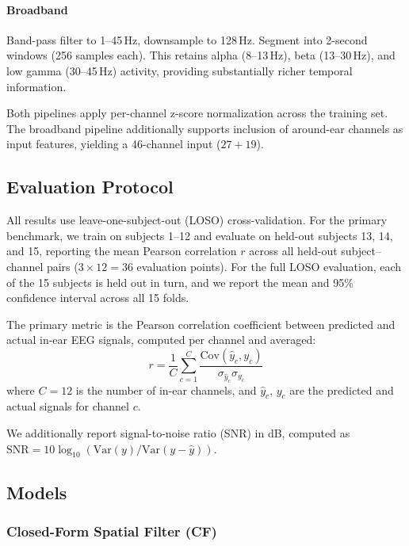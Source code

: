 \documentclass[conference]{IEEEtran}
\begin{document}
\paragraph{Broadband} Band-pass filter to 1--45\,Hz, downsample to 128\,Hz. Segment into 2-second windows (256 samples each). This retains alpha (8--13\,Hz), beta (13--30\,Hz), and low gamma (30--45\,Hz) activity, providing substantially richer temporal information.

Both pipelines apply per-channel z-score normalization across the training set. The broadband pipeline additionally supports inclusion of around-ear channels as input features, yielding a 46-channel input ($27 + 19$).

\subsection{Evaluation Protocol}

All results use leave-one-subject-out (LOSO) cross-validation. For the primary benchmark, we train on subjects 1--12 and evaluate on held-out subjects 13, 14, and 15, reporting the mean Pearson correlation $r$ across all held-out subject--channel pairs ($3 \times 12 = 36$ evaluation points). For the full LOSO evaluation, each of the 15 subjects is held out in turn, and we report the mean and 95\% confidence interval across all 15 folds.

The primary metric is the Pearson correlation coefficient between predicted and actual in-ear EEG signals, computed per channel and averaged:
\begin{equation}
    r = \frac{1}{C} \sum_{c=1}^{C} \frac{\text{Cov}(\hat{y}_c, y_c)}{\sigma_{\hat{y}_c} \sigma_{y_c}}
\end{equation}
where $C = 12$ is the number of in-ear channels, and $\hat{y}_c$, $y_c$ are the predicted and actual signals for channel $c$.

We additionally report signal-to-noise ratio (SNR) in dB, computed as $\text{SNR} = 10 \log_{10}(\text{Var}(y) / \text{Var}(y - \hat{y}))$.

\subsection{Models}

\subsubsection{Closed-Form Spatial Filter (CF)}
\end{document}
